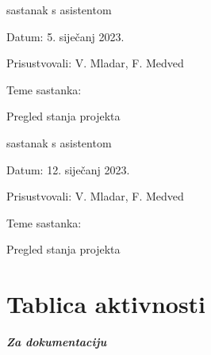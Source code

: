 \begin{packed_enum}
			\item  sastanak s asistentom
			\item[] \begin{packed_item}
				\item Datum: 5. siječanj 2023.
				\item Prisustvovali: V. Mladar, F. Medved
				\item Teme sastanka:
				\begin{packed_item}
					\item  Pregled stanja projekta
				\end{packed_item}
			\end{packed_item}
			\bigskip

			\item  sastanak s asistentom
			\item[] \begin{packed_item}
				\item Datum: 12. siječanj 2023.
				\item Prisustvovali: V. Mladar, F. Medved
				\item Teme sastanka:
				\begin{packed_item}
					\item  Pregled stanja projekta
				\end{packed_item}
			\end{packed_item}
			\bigskip

		\end{packed_enum}

		\eject
		\section*{Tablica aktivnosti}

			\textbf{\textit{Za dokumentaciju}}\\

